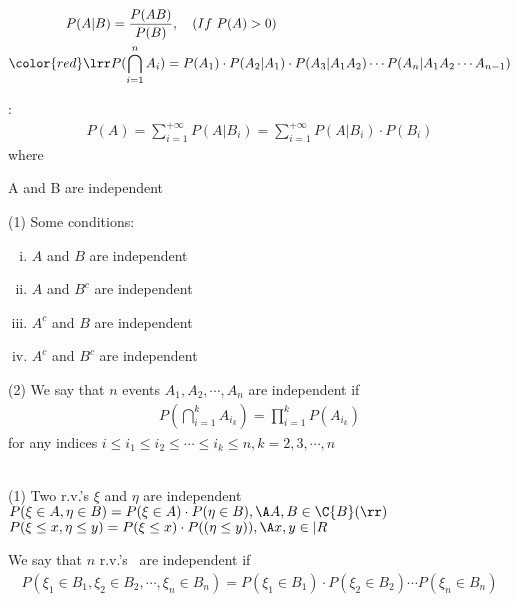 \newcommand{\fuzhu}{
    独立性介绍了三个方面：\\
    （1） 两事件的之间的独立性 
    （2） 随机变量之间的独立性 
    （3） $\sigma$ 域之间的独立性  
}

\newpage
{}


\begin{definition}
    \begin{align*}
        P(A|B) & = \frac{P(AB)}{P(B)}, \quad (If\ P(A) > 0) \\
        {\color{red} \lrr } & 
        P(\bigcap_{i=1}^{n}{A_i}) = P(A_1)\cdot P(A_2|A_1) \cdot P(A_3|A_1A_2)\cdots P(A_n|A_1A_2\cdots A_{n-1})        
    \end{align*}
\end{definition}

\begin{definition}
    :
    \begin{align*}
        P(A) = \sum_{i=1}^{+\infty}{P(A|B_i)} = \sum_{i=1}^{+\infty}{P(A|B_i)\cdot P(B_i)}
    \end{align*} 
    where   
\end{definition}



\begin{definition}
    A and B are independent \equ {}
\end{definition}
\remark (1) Some conditions:
\begin{enumerate}[(i)]
    \item  $A$ and $B$ are independent
    \item \equ $A$ and $B^c$ are independent
    \item \equ $A^c$ and $B$ are independent
    \item \equ $A^c$ and $B^c$ are independent
\end{enumerate} 

(2) We say that $n$ events $A_1, A_2,\cdots, A_n$ are independent if
\begin{align*}
    P(\bigcap_{i=1}^{k}{A_{i_k}}) = \prod_{i=1}^{k}{P(A_{i_k})}
\end{align*}
for any indices $i\le i_1 \le i_2 \le \cdots \le i_k \le n, k = 2, 3, \cdots, n$


\begin{definition}
    \mbox{}\\
    (1) Two r.v.'s $\xi$ and $\eta$ are independent \\
    \equ $P(\xi \in A, \eta \in B) = P(\xi \in A)\cdot P(\eta\in B), \A A, B \in \C{B}(\rr)$ \\
    \equ $P(\xi \le x, \eta \le y) = P(\xi \le x)\cdot P((\eta \le y)), \A x, y \in |R$

    We say that $n$ r.v.'s \seqxi\ are independent if 
    \begin{align*}
        P(\xi_1\in B_1, \xi_2\in B_2, \cdots, \xi_n\in B_n) = P(\xi_1\in B_1)\cdot P(\xi_2\in B_2) \cdots P(\xi_n\in B_n) 
    \end{align*}  
\end{definition}


